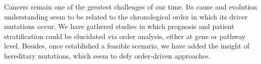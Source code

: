 Cancers remain one of the greatest challenges of our time. Its cause and evolution understanding seem to be related to the chronological order in which its driver mutations occur. We have gathered studies in which prognosis and patient stratification could be elucidated via order analysis, either at gene or pathway level. Besides, once established a feasible scenario, we have added the insight of hereditary mutations, which seem to defy order-driven approaches.